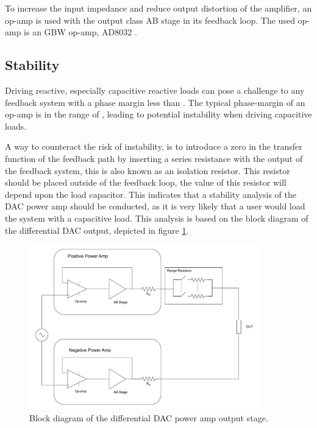 To increase the input impedance and reduce output distortion of the amplifier, an op-amp is used with the output class AB stage in its feedback loop. The used op-amp is an  GBW op-amp, AD8032 \cite{AD8032_datasheet}. 

\subsection*{Stability}
Driving reactive, especially capacitive reactive loads can pose a challenge to any feedback system with a phase margin less than . The typical phase-margin of an op-amp is in the range of , leading to potential instability when driving capacitive loads.

A way to counteract the risk of instability, is to introduce a zero in the transfer function of the feedback path by inserting a series resistance with the output of the feedback system, this is also known as an isolation resistor. This resistor should be placed outside of the feedback loop, the value of this resistor will depend upon the load capacitor. This indicates that a stability analysis of the DAC power amp should be conducted, as it is very likely that a user would load the system with a capacitive load. This analysis is based on the block diagram of the differential DAC output, depicted in figure \ref{fig_7_1_1_5_DAC_POWER_AMP_BLOCK}. 


\begin{figure}[H]
    \centering
    \includegraphics[clip, trim=0 0 0 0, width=0.9\textwidth]{Sections/7_SystemDesign/Figures/DAC_POWER_BLOCK.pdf}
    \caption{Block diagram of the differential DAC power amp output stage.}
    \label{fig_7_1_1_5_DAC_POWER_AMP_BLOCK}
\end{figure}

